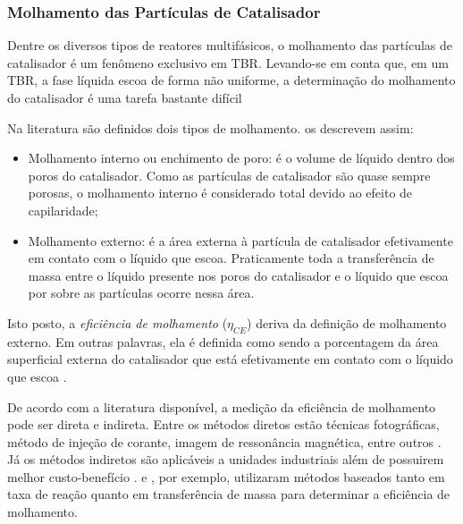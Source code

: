 
\subsubsection{Molhamento das Partículas de Catalisador}
\label{sec:molhamento}

Dentre os diversos tipos de reatores multifásicos, o molhamento das partículas
de catalisador é um fenômeno exclusivo em TBR. Levando-se em conta que, em um
TBR, a fase líquida escoa de forma não uniforme, a determinação do molhamento do
catalisador é uma tarefa bastante difícil \cite{Ranade2011}

Na literatura são definidos dois tipos de molhamento. 
os descrevem assim:

\begin{itemize}
	\item Molhamento interno ou enchimento de poro: é o volume de líquido dentro
	dos poros do catalisador. Como as partículas de catalisador são quase sempre
	porosas, o molhamento interno é considerado total devido ao efeito de
	capilaridade;
	\item Molhamento externo: é a área externa à partícula de catalisador
	efetivamente em contato com o líquido que escoa. Praticamente toda a
	transferência de massa entre o líquido presente nos poros do catalisador e o
	líquido que escoa por sobre as partículas ocorre nessa área.
\end{itemize}

Isto posto, a \emph{eficiência de molhamento} ($\eta_{CE}$) deriva da definição
de molhamento externo. Em outras palavras, ela é definida como sendo a
porcentagem da área superficial externa do catalisador que está efetivamente em
contato com o líquido que escoa \cite{Schwartz1976}.

De acordo com a literatura disponível, a medição da eficiência de molhamento
pode ser direta e indireta. Entre os métodos diretos estão técnicas
fotográficas, método de injeção de corante, imagem de ressonância magnética,
entre outros . Já os métodos indiretos são
aplicáveis a unidades industriais além de possuirem melhor custo-benefício
\cite{Ranade2011}.  e , por
exemplo, utilizaram métodos baseados tanto em taxa de reação quanto em
transferência de massa para determinar a eficiência de molhamento.

